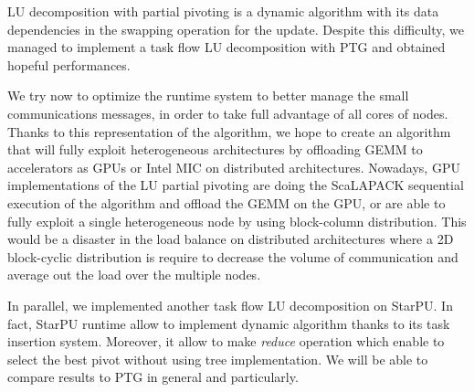 LU decomposition with partial pivoting is a dynamic algorithm with its data dependencies in the swapping operation for the update. Despite this difficulty, we managed to implement a task flow LU decomposition with PTG and obtained hopeful performances.

We try now to optimize the \dague runtime system to better manage the small communications messages, in order to take full advantage of all cores of nodes. 
Thanks to this representation of the algorithm, we hope to create an algorithm that will fully exploit heterogeneous architectures by offloading GEMM to accelerators as GPUs or Intel MIC on distributed architectures. Nowadays, GPU implementations of the LU partial pivoting are doing the ScaLAPACK sequential execution of the algorithm and offload the GEMM on the GPU, or are able to fully exploit a single heterogeneous node by using block-column distribution. This would be a disaster in the load balance on distributed architectures where a 2D block-cyclic distribution is require to decrease the volume of communication and average out the load over the multiple nodes. 

In parallel, we implemented another task flow LU decomposition on StarPU. In fact, StarPU runtime allow to implement dynamic algorithm  thanks to its task insertion system. Moreover, it allow to make \emph{reduce} operation which enable to select the best pivot without using tree implementation. We will be able to compare results to PTG in general and \dague particularly.